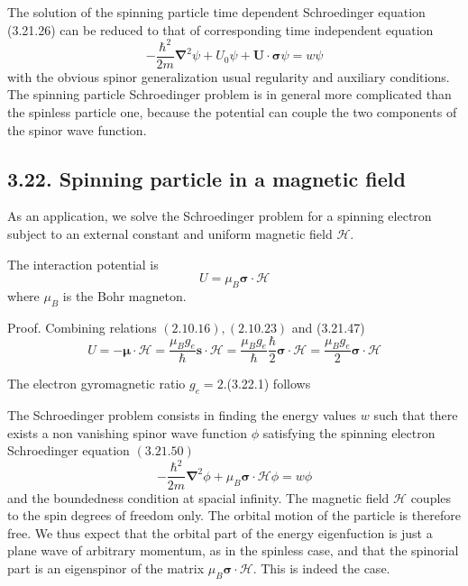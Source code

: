 \documentclass{article}
\begin{document}
The solution of the spinning particle time dependent Schroedinger equation (3.21.26) can be reduced to that of corresponding time independent equation
$$
\begin{equation*}
-\frac{\hbar^{2}}{2 m} \boldsymbol{\nabla}^{2} \psi+U_{0} \psi+\boldsymbol{U} \cdot \boldsymbol{\sigma} \psi=w \psi \tag{3.21.50}
\end{equation*}
$$
with the obvious spinor generalization usual regularity and auxiliary conditions. The spinning particle Schroedinger problem is in general more complicated than the spinless particle one, because the potential can couple the two components of the spinor wave function.

\subsection*{3.22. Spinning particle in a magnetic field}

As an application, we solve the Schroedinger problem for a spinning electron subject to an external constant and uniform magnetic field $\mathcal{H}$.

The interaction potential is
$$
\begin{equation*}
U=\mu_{B} \boldsymbol{\sigma} \cdot \mathcal{H} \tag{3.22.1}
\end{equation*}
$$
where $\mu_{B}$ is the Bohr magneton.

Proof. Combining relations $(2.10 .16),(2.10 .23)$ and (3.21.47)
$$
\begin{equation*}
U=-\boldsymbol{\mu} \cdot \mathcal{H}=\frac{\mu_{B} g_{e}}{\hbar} \boldsymbol{s} \cdot \boldsymbol{\mathcal { H }}=\frac{\mu_{B} g_{e}}{\hbar} \frac{\hbar}{2} \boldsymbol{\sigma} \cdot \boldsymbol{\mathcal { H }}=\frac{\mu_{B} g_{e}}{2} \boldsymbol{\sigma} \cdot \mathcal{H} \tag{3.22.2}
\end{equation*}
$$

The electron gyromagnetic ratio $g_{e}=2$.(3.22.1) follows

The Schroedinger problem consists in finding the energy values $w$ such that there exists a non vanishing spinor wave function $\phi$ satisfying the spinning electron Schroedinger equation $(3.21 .50)$
$$
\begin{equation*}
-\frac{\hbar^{2}}{2 m} \boldsymbol{\nabla}^{2} \phi+\mu_{B} \boldsymbol{\sigma} \cdot \boldsymbol{\mathcal { H }} \phi=w \phi \tag{3.22.3}
\end{equation*}
$$
and the boundedness condition at spacial infinity.
The magnetic field $\mathcal{H}$ couples to the spin degrees of freedom only. The orbital motion of the particle is therefore free. We thus expect that the orbital part of the energy eigenfuction is just a plane wave of arbitrary momentum, as in the spinless case, and that the spinorial part is an eigenspinor of the matrix $\mu_{B} \boldsymbol{\sigma} \cdot \mathcal{H}$. This is indeed the case.
\end{document}
